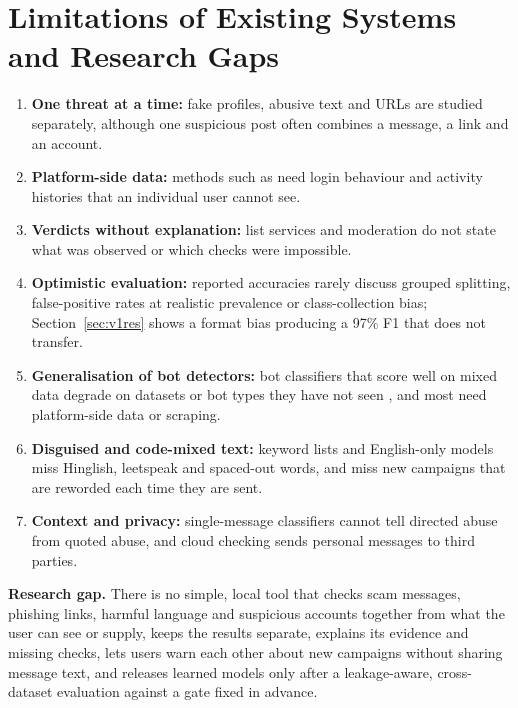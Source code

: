 \section{Limitations of Existing Systems and Research Gaps}
\begin{enumerate}
\item \textbf{One threat at a time:} fake profiles, abusive text and URLs are studied separately, although one suspicious post often combines a message, a link and an account.
\item \textbf{Platform-side data:} methods such as \cite{lit2} need login behaviour and activity histories that an individual user cannot see.
\item \textbf{Verdicts without explanation:} list services and moderation do not state what was observed or which checks were impossible.
\item \textbf{Optimistic evaluation:} reported accuracies rarely discuss grouped splitting, false-positive rates at realistic prevalence or class-collection bias; Section~\ref{sec:v1res} shows a format bias producing a 97\% F1 that does not transfer.
\item \textbf{Generalisation of bot detectors:} bot classifiers that score well on mixed data degrade on datasets or bot types they have not seen \cite{yang2020}, and most need platform-side data or scraping.
\item \textbf{Disguised and code-mixed text:} keyword lists and English-only models miss Hinglish, leetspeak and spaced-out words, and miss new campaigns that are reworded each time they are sent.
\item \textbf{Context and privacy:} single-message classifiers cannot tell directed abuse from quoted abuse, and cloud checking sends personal messages to third parties.
\end{enumerate}

\noindent\textbf{Research gap.} There is no simple, local tool that checks scam messages, phishing links, harmful language and suspicious accounts together from what the user can see or supply, keeps the results separate, explains its evidence and missing checks, lets users warn each other about new campaigns without sharing message text, and releases learned models only after a leakage-aware, cross-dataset evaluation against a gate fixed in advance.


